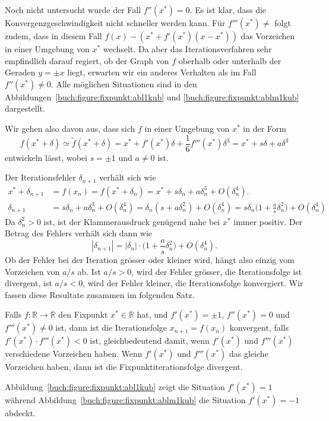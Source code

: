 Noch nicht untersucht wurde der Fall $f''(x^*)=0$.
Es ist klar, dass die Konvergenzgeschwindigkeit nicht schneller
werden kann.
Für $f'''(x^*)\ne $ folgt zudem, dass in diesem Fall
$f(x)-(x^* + f'(x^*)(x-x^*))$
das Vorzeichen in einer Umgebung von $x^*$ wechselt.
Da aber das Iterationsverfahren sehr empfindlich darauf regiert, ob
der Graph von $f$ oberhalb oder unterhalb der Geraden $y=\pm x$ 
liegt, erwarten wir ein anderes Verhalten als im Fall $f''(x^*)\ne 0$.
%
Alle möglichen Situationen sind in den
Abbildungen~\ref{buch:figure:fixpunkt:abl1kub} und
\ref{buch:figure:fixpunkt:ablm1kub} dargestellt.

Wir gehen also davon aus, dass sich $f$ in einer Umgebung von $x^*$
in der Form
\[
f(x^*+\delta)
\simeq
\tilde{f}(x^*+\delta)
=
x^* + f'(x^*)\delta + \frac1{6}f'''(x^*) \delta^3
=
x^* + s\delta + a\delta^3
\]
entwickeln lässt, wobei $s=\pm 1$ und $a\ne 0$ ist.

Der Iterationsfehler $\delta_{n+1}$ verhält sich wie
\begin{align*}
x^* + \delta_{n+1}
&=
f(x_n)
=
f(x^* + \delta_n)
=
x^* + s\delta_n + a\delta_n^3 + O(\delta_n^4).
\\
\delta_{n+1}
&=
s\delta_n + a\delta_n^3 + O(\delta_n^4)
=
\delta_n(s+a\delta_n^2) + O(\delta_n^4)
=
s\delta_n\biggl(1+\frac{a}{s}\delta_n^2\biggr) + O(\delta_n^4)
\end{align*}
Da $\delta_n^2>0$ ist, ist der Klammerausdruck genügend nahe bei $x^*$
immer positiv.
Der Betrag des Fehlers verhält sich dann wie
\[
|\delta_{n+1}|
=
|\delta_n| \cdot \biggl(1 + \frac{a}{s}\delta_n^2\biggr) + O(\delta_n^4).
\]
Ob der Fehler bei der Iteration grösser oder kleiner wird, hängt also
einzig vom Vorzeichen von $a/s$ ab.
Ist $a/s > 0$, wird der Fehler grösser, die Iterationsfolge ist divergent,
ist $a/s < 0$, wird der Fehler kleiner, die Iterationsfolge konvergiert.
Wir fassen diese Resultate zusammen im folgenden Satz.

\begin{satz}
Falls $f\colon\mathbb R\to\mathbb R$ den Fixpunkt $x^*\in\mathbb R$ hat,
und $f'(x^*)=\pm1$, $f''(x^*)=0$ und $f'''(x^*)\ne 0$ ist, dann ist die
Iterationsfolge $x_{n+1}=f(x_n)$ konvergent, falls $f'(x^*)\cdot f'''(x^*)<0$
ist, gleichbedeutend damit, wenn $f'(x^*)$ und $f'''(x^*)$ verschiedene
Vorzeichen haben.
Wenn $f'(x^*)$ und $f'''(x^*)$ das gleiche Vorzeichen haben, dann ist
die Fixpunktiterationsfolge divergent.
\end{satz}

Abbildung~\ref{buch:figure:fixpunkt:abl1kub} zeigt die Situation $f'(x^*)=1$
während Abbildung~\ref{buch:figure:fixpunkt:ablm1kub} die Situation
$f'(x^*)=-1$ abdeckt.

